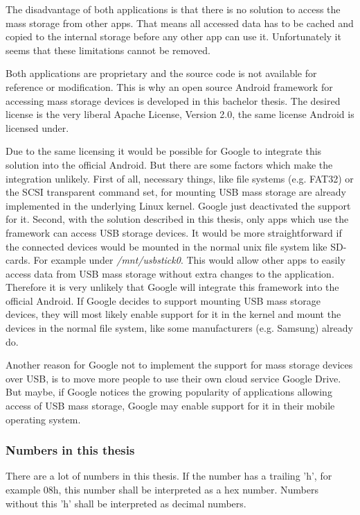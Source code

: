 The disadvantage of both applications is that there is no solution to access the mass storage from other apps. That means all accessed data has to be cached and copied to the internal storage before any other app can use it. Unfortunately it seems that these limitations cannot be removed.

Both applications are proprietary and the source code is not available for reference or modification. This is why an open source Android framework for accessing mass storage devices is developed in this bachelor thesis. The desired license is the very liberal Apache License, Version 2.0, the same license Android is licensed under.

Due to the same licensing it would be possible for Google to integrate this solution into the official Android. But there are some factors which make the integration unlikely. First of all, necessary things, like file systems (e.g. FAT32) or the SCSI transparent command set, for mounting USB mass storage are already implemented in the underlying Linux kernel. Google just deactivated the support for it. Second, with the solution described in this thesis, only apps which use the framework can access USB storage devices. It would be more straightforward if the connected devices would be mounted in the normal unix file system like SD-cards. For example under \textit{/mnt/usbstick0}. This would allow other apps to easily access data from USB mass storage without extra changes to the application. Therefore it is very unlikely that Google will integrate this framework into the official Android. If Google decides to support mounting USB mass storage devices, they will most likely enable support for it in the kernel and mount the devices in the normal file system, like some manufacturers (e.g. Samsung) already do.

Another reason for Google not to implement the support for mass storage devices over USB, is to move more people to use their own cloud service Google Drive. But maybe, if Google notices the growing popularity of applications allowing access of USB mass storage, Google may enable support for it in their mobile operating system.

\subsubsection{Numbers in this thesis}

There are a lot of numbers in this thesis. If the number has a trailing 'h', for example 08h, this number shall be interpreted as a hex number. Numbers without this 'h' shall be interpreted as decimal numbers.


